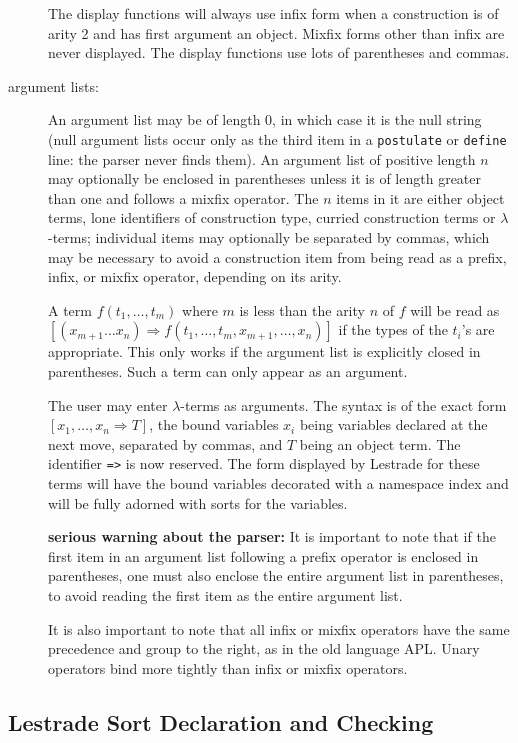 \documentclass[12pt]{article}
\begin{document}
\begin{description}
The display functions will always use infix form when a construction is of arity 2 and has first argument an object.  Mixfix forms other than infix are never displayed.   The display functions use lots of parentheses and commas.

\item[argument lists:]  An argument list may be of length 0, in which case it is the null string (null argument lists occur only as the third item in a {\tt postulate} or {\tt define} line:  the parser never finds them).  An argument list of positive length $n$ may optionally be enclosed in parentheses unless it is of length greater than one and follows a mixfix operator.  The $n$  items in it are either object terms, lone identifiers of construction type, curried construction terms or $\lambda$-terms;  individual items may optionally be separated by commas, which may be necessary to avoid a construction item from being read as a prefix, infix, or mixfix operator, depending on its arity.  

A term $f(t_1,\ldots,t_m)$ where $m$ is less than the arity $n$ of $f$ will be read as $[(x_{m+1}\ldots x_n) \Rightarrow f(t_1,\ldots,t_m,x_{m+1},\dots,x_n)]$ if the types of the $t_i$'s are appropriate.  This only works if the argument list is explicitly closed in parentheses.    Such a term can only appear as an argument.

The user may enter $\lambda$-terms as arguments.  The syntax is of the exact form $[x_1,\ldots,x_n \Rightarrow T]$, the bound variables $x_i$ being variables declared at the next move, separated by commas, and $T$ being an object term.  The identifier {\tt =>} is now reserved.  The form displayed by Lestrade for these terms will have the bound variables decorated with a namespace index and will be fully adorned with sorts for the variables.

{\bf serious warning about the parser:} It is important to note that if the first item in an argument list following a prefix operator is enclosed in parentheses, one must also enclose the entire argument list in parentheses, to avoid reading the first item as the entire argument list.

It is also important to note that all infix or mixfix operators have the same precedence and group to the right, as in the old language APL.  Unary operators bind more tightly than infix or mixfix operators.

\end{description}

\subsection{Lestrade Sort Declaration and Checking}
\end{document}
